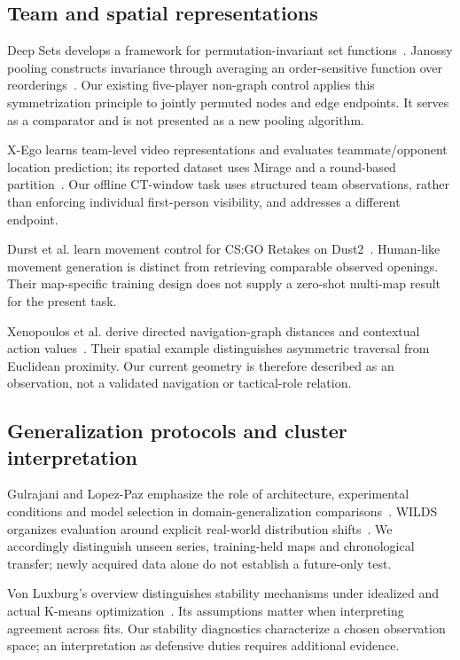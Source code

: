 \subsection{Team and spatial representations}
Deep Sets develops a framework for permutation-invariant set functions~\cite{NIPS2017_f22e4747}. Janossy pooling constructs invariance through averaging an order-sensitive function over reorderings~\cite{murphy2019janossy}. Our existing five-player non-graph control applies this symmetrization principle to jointly permuted nodes and edge endpoints. It serves as a comparator and is not presented as a new pooling algorithm.

X-Ego learns team-level video representations and evaluates teammate/opponent location prediction; its reported dataset uses Mirage and a round-based partition~\cite{wang2025xego}. Our offline CT-window task uses structured team observations, rather than enforcing individual first-person visibility, and addresses a different endpoint. %

Durst et al. learn movement control for CS:GO Retakes on Dust2~\cite{durst2024move}. Human-like movement generation is distinct from retrieving comparable observed openings. Their map-specific training design does not supply a zero-shot multi-map result for the present task. %

Xenopoulos et al. derive directed navigation-graph distances and contextual action values~\cite{xenopoulos2020valuing}. Their spatial example distinguishes asymmetric traversal from Euclidean proximity. Our current geometry is therefore described as an observation, not a validated navigation or tactical-role relation. %

\subsection{Generalization protocols and cluster interpretation}
Gulrajani and Lopez-Paz emphasize the role of architecture, experimental conditions and model selection in domain-generalization comparisons~\cite{gulrajani2020domain}. WILDS organizes evaluation around explicit real-world distribution shifts~\cite{koh2021wilds}. We accordingly distinguish unseen series, training-held maps and chronological transfer; newly acquired data alone do not establish a future-only test. %

Von Luxburg's overview distinguishes stability mechanisms under idealized and actual K-means optimization~\cite{luxburg2010stability}. Its assumptions matter when interpreting agreement across fits. Our stability diagnostics characterize a chosen observation space; an interpretation as defensive duties requires additional evidence. %

